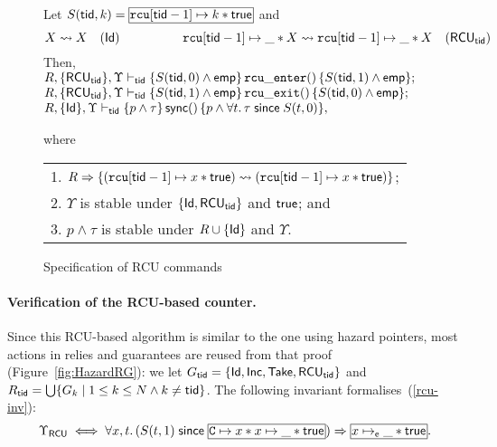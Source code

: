 

\begin{figure}[t]
{\small
Let $S(\ltid,k) = \shared{\rcu[\ltid-1]\mapsto k * \true}$ and 
$$
X \leadsto X \quad(\textsf{Id})
\quad
\qquad
\qquad
\texttt{rcu}[{\sf tid}-1] \mapsto \_ * X \leadsto \texttt{rcu}[{\sf tid}-1] \mapsto \_ * X \quad(\textsf{RCU}_{\sf tid})
$$
Then, \quad
$
\begin{array}[t]{@{}l@{}}
R, \{\RCU_\ltid\},\Upsilon \vdash_\ltid
\{S(\ltid,0) \wedge \emp \} \, \mathtt{rcu\_enter()} \, \{S(\ltid,1) \wedge \emp \};
\\
R,\{\RCU_\ltid\},\Upsilon \vdash_\ltid \{S(\ltid,1) \wedge \emp \} \,
\mathtt{rcu\_exit()}\,\{S(\ltid,0)  \wedge \emp \};
\\
R,\{{\sf Id}\},\Upsilon \vdash_\ltid
\{ p \wedge \tau \}\, \sync()\, 
\{p \wedge \forall t.\, \tau \since S(t,0) \},
\end{array}
$

\smallskip
where \quad
\begin{tabular}[t]{@{}l@{}}
1. $R \Rightarrow \{(\texttt{rcu}[{\sf tid}-1] \mapsto x * \mathsf{true}) \leadsto (\texttt{rcu}[{\sf tid}-1] \mapsto x * \mathsf{true})\}$;
\\
2. $\Upsilon$ is stable under $\{{\sf Id}, \textsf{RCU}_{\sf tid}\}$ and $\mathsf{true}$; and
\\
3. $p \wedge \tau$ is stable under $R \cup \{{\sf Id}\}$ and $\Upsilon$.
\end{tabular}
}
\caption{\label{fig:rcu-spec} \small
Specification of RCU commands}
\end{figure}

\paragraph{Verification of the RCU-based counter.} Since this RCU-based algorithm is similar to the
one using hazard pointers, most actions in relies and guarantees are reused from
that proof (Figure~\ref{fig:HazardRG}): we let $G_{\sf tid} = \{\textsf{Id},
\textsf{Inc}, \textsf{Take}, \textsf{RCU}_{\sf tid} \}$ and $R_{\sf tid} = \bigcup \{G_{k} \mid
{1 \le k \le N} \wedge {k \not= {\sf tid}}\}$. The following invariant
formalises~(\ref{rcu-inv}):
$$
\Upsilon_{\RCU} \iff
  \forall x, t.\,  (S(t,1) \since 
\shareds{\cc \mapsto x * x \mapsto \_ * \true})
  \Rightarrow \shareds{x \mapsto_{\se} \_* \true}.
$$


